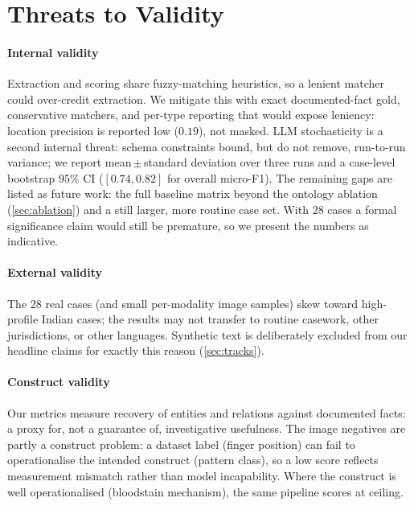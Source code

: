 \documentclass[conference]{IEEEtran}
\begin{document}
\section{Threats to Validity}
\label{sec:threats}

\paragraph*{Internal validity} Extraction and scoring share fuzzy-matching
heuristics, so a lenient matcher could over-credit extraction. We mitigate this
with exact documented-fact gold, conservative matchers, and per-type reporting
that would expose leniency: location precision is reported low ($0.19$), not
masked. LLM stochasticity is a second internal threat: schema constraints bound,
but do not remove, run-to-run variance; we report mean\,$\pm$\,standard deviation
over three runs and a case-level bootstrap $95\%$ CI ($[0.74,0.82]$ for overall
micro-F1). The remaining gaps are listed as
future work: the full baseline matrix beyond the ontology ablation
(\cref{sec:ablation}) and a still larger, more routine case set. With $28$ cases
a formal significance claim would still be premature, so we present the numbers as
indicative.

\paragraph*{External validity} The $28$ real cases (and small per-modality image
samples) skew toward high-profile Indian cases; the results may not transfer to
routine casework, other jurisdictions, or other languages. Synthetic text is
deliberately excluded from our headline claims for exactly this reason
(\cref{sec:tracks}).

\paragraph*{Construct validity} Our metrics measure recovery of entities and
relations against documented facts: a proxy for, not a guarantee of, investigative
usefulness. The image negatives are partly a construct problem: a dataset label
(finger position) can fail to operationalise the intended construct (pattern
class), so a low score reflects measurement mismatch rather than model
incapability. Where the construct is well operationalised (bloodstain mechanism),
the same pipeline scores at ceiling.
\end{document}

